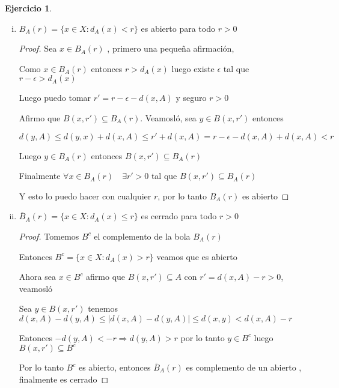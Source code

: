 \documentclass[11pt]{report}
\newcommand{\N}{\mathbb{N}}
\newcommand{\Ra}{\Rightarrow}
\newcommand{\ra}{\rightarrow}
\newcommand{\ol}{\overline}
\theoremstyle{definition}
\newtheorem{ej}{Ejercicio}
\begin{document}
\begin{ej}
\begin{enumerate}[i.]
\begin{proof}
	    Entonces existe un sucesión $d_n \in D^x \quad \forall n \in \N$ tal que $d_n \ra 0$

	    Luego para cada $n \in \N$  existe $a \in A$ tal que $d_n = d(x,a)$ llamemosló $a_n$ 

	    Por lo tanto $d(x,a_n)= d_n \ra 0 $ tenemos $a_n \in A \quad \forall n \in \N$ y además $a_n \ra x$

	     Finalmente $ x \in \ol A$

	     $\Leftarrow )$ Sea $x \in \ol A$ entonces existe $(x_n)_n \subseteq A$ tal que $x_n \ra x$

	     Entonces tenemos que $d(x_n,x) \ra 0$ por lo tanto tenemos $(d_n)_n \subseteq D^x$ tal que $d_n \ra 0$ pero además sabemos que 0 es cota inferiór entonces $0 = \inf D^x = d_{A}(x)$
	  \end{proof}
    \item $B_A(r) = \{x \in X : d_A(x) < r \}$ es abierto para todo $r>0$
      \begin{proof}
	Sea $x \in B_A(r)$ , primero una pequeña afirmación, 

	Como $x \in B_A(r)$ entonces $r > d_A(x) $ luego existe $\epsilon$ tal que $r - \epsilon > d_A(x)$

	Luego puedo tomar $r' = r  - \epsilon - d(x,A)$ y seguro $r > 0$

	Afirmo que $B(x,r') \subseteq B_A(r)$. Veamosló, sea $y \in B(x,r')$ entonces 

	$d(y,A) \leq d(y,x) + d(x,A) \leq r' + d(x,A) = r - \epsilon - d(x,A) + d(x,A) <r$

	Luego $y \in B_A(r)$ entonces $B(x,r') \subseteq B_A(r)$ 

	Finalmente $\forall x \in B_{A}(r) \quad \exists r' >0 $ tal que $B(x,r') \subseteq B_A(r)$ 

	Y esto lo puedo hacer con cualquier $r$, por lo tanto $B_A(r)$ es abierto
      \end{proof}
    \item $\ol B_{A}(r) = \{x \in X : d_A(x) \leq r\} $ es cerrado para todo $r>0$
      \begin{proof}
	      Tomemos $B^c$ el complemento de la bola $B_{A}(r)$

	      Entonces $B^c = \{x \in X : d_A(x) > r\}$ veamos que es abierto

	Ahora sea $x \in B^c$ afirmo que $B(x,r') \subseteq A$ con $r' = d(x,A) - r > 0 $, veamosló

	Sea $y \in B(x,r')$ tenemos $d(x,A) - d(y,A) \leq |d(x,A) - d(y,A)| \leq d(x,y) < d(x,A) -r $

      Entonces $-d(y,A) < -r \Ra d(y,A) > r$ por lo tanto $y \in B^c$ luego $B(x,r') \subseteq B^c$

      Por lo tanto $B^c$ es abierto, entonces $\ol B_A(r)$ es complemento de un abierto , finalmente es cerrado
      \end{proof}
  \end{enumerate}
\end{ej}
\end{document}
